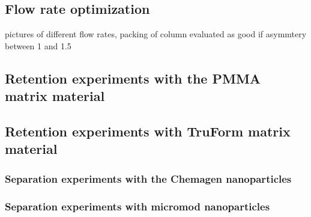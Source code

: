 \subsection{Flow rate optimization}
\label{subsec:flow_rate_res}

pictures of different flow rates, packing of column evaluated as good if asymmtery between 1 and 1.5
\subsection{Retention experiments with the PMMA matrix material}
\label{subsec:pmma_res}

\subsection{Retention experiments with TruForm matrix material}
\label{subsec:trufrom_res}

\subsubsection{Separation experiments with the Chemagen nanoparticles}
\label{subsubsec:chemagen_res}

\subsubsection{Separation experiments with micromod nanoparticles}
\label{subsubsec:micromod_res}